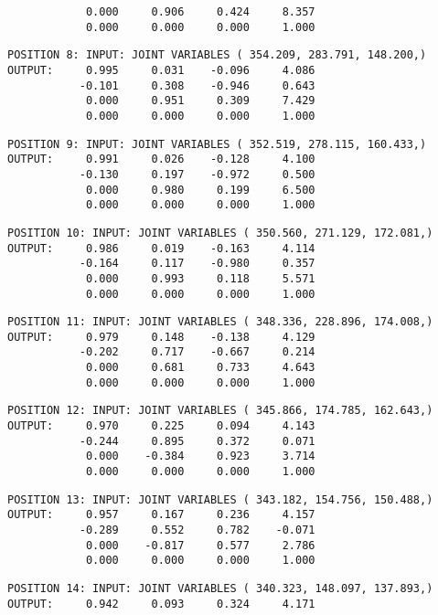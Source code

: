 \begin{verbatim}
            0.000     0.906     0.424     8.357
            0.000     0.000     0.000     1.000
\end{verbatim} \pagebreak[1]\begin{verbatim}
POSITION 8: INPUT: JOINT VARIABLES ( 354.209, 283.791, 148.200,)
OUTPUT:     0.995     0.031    -0.096     4.086
           -0.101     0.308    -0.946     0.643
            0.000     0.951     0.309     7.429
            0.000     0.000     0.000     1.000
\end{verbatim} \pagebreak[1]\begin{verbatim}
POSITION 9: INPUT: JOINT VARIABLES ( 352.519, 278.115, 160.433,)
OUTPUT:     0.991     0.026    -0.128     4.100
           -0.130     0.197    -0.972     0.500
            0.000     0.980     0.199     6.500
            0.000     0.000     0.000     1.000
\end{verbatim} \pagebreak[1]\begin{verbatim}
POSITION 10: INPUT: JOINT VARIABLES ( 350.560, 271.129, 172.081,)
OUTPUT:     0.986     0.019    -0.163     4.114
           -0.164     0.117    -0.980     0.357
            0.000     0.993     0.118     5.571
            0.000     0.000     0.000     1.000
\end{verbatim} \pagebreak[1]\begin{verbatim}
POSITION 11: INPUT: JOINT VARIABLES ( 348.336, 228.896, 174.008,)
OUTPUT:     0.979     0.148    -0.138     4.129
           -0.202     0.717    -0.667     0.214
            0.000     0.681     0.733     4.643
            0.000     0.000     0.000     1.000
\end{verbatim} \pagebreak[1]\begin{verbatim}
POSITION 12: INPUT: JOINT VARIABLES ( 345.866, 174.785, 162.643,)
OUTPUT:     0.970     0.225     0.094     4.143
           -0.244     0.895     0.372     0.071
            0.000    -0.384     0.923     3.714
            0.000     0.000     0.000     1.000
\end{verbatim} \pagebreak[1]\begin{verbatim}
POSITION 13: INPUT: JOINT VARIABLES ( 343.182, 154.756, 150.488,)
OUTPUT:     0.957     0.167     0.236     4.157
           -0.289     0.552     0.782    -0.071
            0.000    -0.817     0.577     2.786
            0.000     0.000     0.000     1.000
\end{verbatim} \pagebreak[1]\begin{verbatim}
POSITION 14: INPUT: JOINT VARIABLES ( 340.323, 148.097, 137.893,)
OUTPUT:     0.942     0.093     0.324     4.171

\end{verbatim}
